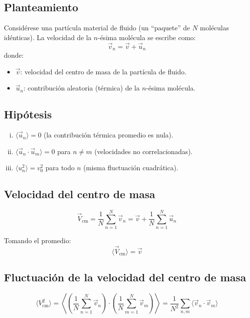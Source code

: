 \subsection{Planteamiento}

Considérese una partícula material de fluido (un ``paquete'' de $N$ moléculas idénticas). La velocidad de la $n$-ésima molécula se escribe como:
$$
\vec{v}_n = \vec{v} + \vec{u}_n
$$
donde:
\begin{itemize}
    \item $\vec{v}$: velocidad del centro de masa de la partícula de fluido.
    \item $\vec{u}_n$: contribución aleatoria (térmica) de la $n$-ésima molécula.
\end{itemize}

\subsection{Hipótesis}

\begin{enumerate}[(i)]
    \item $\langle \vec{u}_n \rangle = 0$ (la contribución térmica promedio es nula).
    \item $\langle \vec{u}_n \cdot \vec{u}_m \rangle = 0$ para $n \neq m$ (velocidades no correlacionadas).
    \item $\langle u_n^2 \rangle = v_0^2$ para todo $n$ (misma fluctuación cuadrática).
\end{enumerate}

\subsection{Velocidad del centro de masa}

$$
\vec{V}_{\text{cm}} = \frac{1}{N} \sum_{n=1}^{N} \vec{v}_n = \vec{v} + \frac{1}{N}\sum_{n=1}^{N} \vec{u}_n
$$

Tomando el promedio:
$$
\langle \vec{V}_{\text{cm}} \rangle = \vec{v}
$$

\subsection{Fluctuación de la velocidad del centro de masa}

$$
\langle V_{\text{cm}}^2 \rangle = \left\langle \left(\frac{1}{N}\sum_{n=1}^N \vec{v}_n\right) \cdot \left(\frac{1}{N}\sum_{m=1}^N \vec{v}_m\right)\right\rangle = \frac{1}{N^2}\sum_{n,m} \langle \vec{v}_n \cdot \vec{v}_m \rangle
$$

